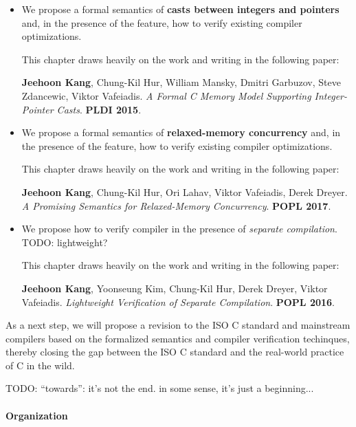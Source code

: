 %
\begin{itemize}
\item We propose a formal semantics of \textbf{casts between integers and pointers} and, in the
  presence of the feature, how to verify existing compiler optimizations.

  This chapter draws heavily on the work and writing in the following paper:

  {\small \cite{intptrcast} \textbf{Jeehoon Kang}, Chung-Kil Hur, William Mansky, Dmitri Garbuzov,
    Steve Zdancewic, Viktor Vafeiadis.  \emph{A Formal C Memory Model Supporting Integer-Pointer
      Casts}.  \textbf{PLDI 2015}.}

\item We propose a formal semantics of \textbf{relaxed-memory concurrency} and, in the presence of
  the feature, how to verify existing compiler optimizations.

  This chapter draws heavily on the work and writing in the following paper:

  {\small \cite{promising} \textbf{Jeehoon Kang}, Chung-Kil Hur, Ori Lahav, Viktor Vafeiadis, Derek
    Dreyer.  \emph{A Promising Semantics for Relaxed-Memory Concurrency}.  \textbf{POPL 2017}.}

\item We propose how to verify compiler in the presence of \emph{separate compilation}.  TODO:
  lightweight?

  This chapter draws heavily on the work and writing in the following paper:

  {\small \cite{sepcomp} \textbf{Jeehoon Kang}, Yoonseung Kim, Chung-Kil Hur, Derek Dreyer, Viktor
    Vafeiadis.  \emph{Lightweight Verification of Separate Compilation}.  \textbf{POPL 2016}.}
\end{itemize}

As a next step, we will propose a revision to the ISO C standard and mainstream compilers based on
the formalized semantics and compiler verification techinques, thereby closing the gap between the
ISO C standard and the real-world practice of C in the wild.

TODO: ``towards'': it's not the end.  in some sense, it's just a beginning...



\paragraph{Organization}

